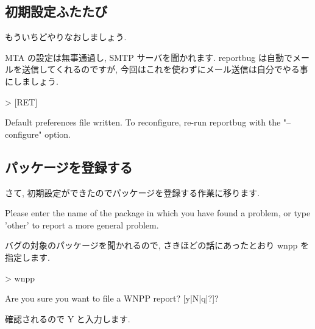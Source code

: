 \documentclass[mingoth,a4paper]{jsarticle}
\begin{document}
\begin{commandline}
\subsection{初期設定ふたたび}

もういちどやりなおしましょう.


MTA の設定は無事通過し, SMTP サーバを聞かれます.
reportbug は自動でメールを送信してくれるのですが,
今回はこれを使わずにメール送信は自分でやる事にしましょう.

\begin{commandline}
> [RET]

Default preferences file written. To reconfigure, re-run reportbug with the "--
configure" option.
\end{commandline}

\subsection{パッケージを登録する}

さて, 初期設定ができたのでパッケージを登録する作業に移ります.

\begin{commandline}
Please enter the name of the package in which you have found a problem, or type
'other' to report a more general problem.
\end{commandline}

バグの対象のパッケージを聞かれるので,
さきほどの話にあったとおり wnpp を指定します.

\begin{commandline}
> wnpp

Are you sure you want to file a WNPP report? [y|N|q|?]?
\end{commandline}

確認されるので Y と入力します.


\end{commandline}
\end{document}
